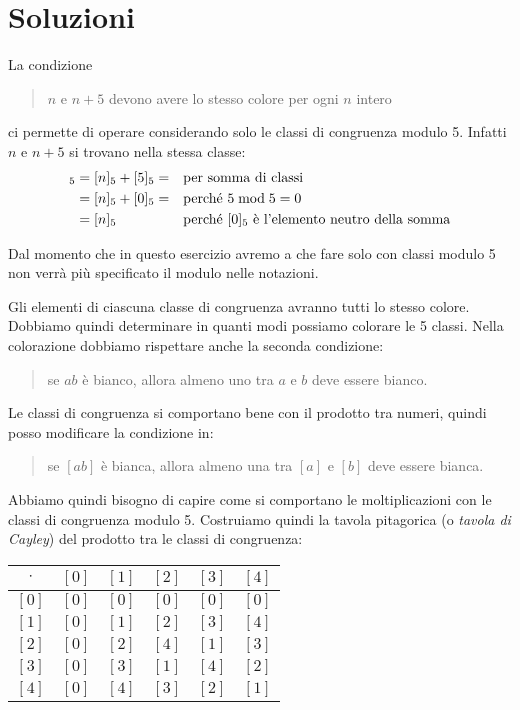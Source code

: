 \chapter{Soluzioni}
\label{ch:soluzioni}

\begin{soluzione}
    La condizione
    \begin{quotation}
        $n$ e $n + 5$ devono avere lo stesso colore per ogni $n$ intero
    \end{quotation}
    ci permette di operare considerando solo le classi di congruenza modulo 5.
    Infatti $n$ e $n + 5$ si trovano nella stessa classe:
    \begin{align*}
        [n + 5]_5 &= [n]_5 + [5]_5 = && \text{per somma di classi} \\
        &= [n]_5 + [0]_5 = && \text{perché $5 \modulo 5 = 0$} \\
        &= [n]_5 && \text{perché $[0]_5$ è l'elemento neutro della somma}
    \end{align*}

    Dal momento che in questo esercizio avremo a che fare solo con classi modulo 5 non verrà più specificato il modulo
    nelle notazioni.

    Gli elementi di ciascuna classe di congruenza avranno tutti lo stesso colore.
    Dobbiamo quindi determinare in quanti modi possiamo colorare le 5 classi.
    Nella colorazione dobbiamo rispettare anche la seconda condizione:
    \begin{quotation}
        se $ab$ è bianco, allora almeno uno tra $a$ e $b$ deve essere bianco.
    \end{quotation}

    Le classi di congruenza si comportano bene con il prodotto tra numeri, quindi posso modificare la condizione in:
    \begin{quotation}
        se $[ab]$ è bianca, allora almeno una tra $[a]$ e $[b]$ deve essere bianca.
    \end{quotation}

    Abbiamo quindi bisogno di capire come si comportano le moltiplicazioni con le classi di congruenza modulo 5.
    Costruiamo quindi la tavola pitagorica (o \emph{tavola di Cayley}) del prodotto tra le classi di congruenza:

    \begin{table}[H]
        \label{tab:distrettuali_2019}
        \centering
        \begin{tabular}{c|ccccc}
            $\cdot$ & $[0]$ & $[1]$ & $[2]$ & $[3]$ & $[4]$ \\
            \midrule
            $[0]$ & $[0]$ & $[0]$ & $[0]$ & $[0]$ & $[0]$ \\
            $[1]$ & $[0]$ & $[1]$ & $[2]$ & $[3]$ & $[4]$ \\
            $[2]$ & $[0]$ & $[2]$ & $[4]$ & $[1]$ & $[3]$ \\
            $[3]$ & $[0]$ & $[3]$ & $[1]$ & $[4]$ & $[2]$ \\
            $[4]$ & $[0]$ & $[4]$ & $[3]$ & $[2]$ & $[1]$
        \end{tabular}
    \end{table}


\end{soluzione}
